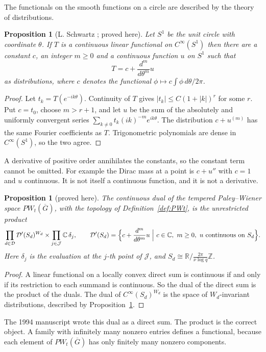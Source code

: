 \documentclass[12pt,letterpaper]{article}
\numberwithin{equation}{section}
\newtheorem{proposition}[theorem]{Proposition}
\theoremstyle{definition}
\newcommand{\proved}{proved here}
\newcommand{\C}{\mathbb C}
\newcommand{\R}{\mathbb R}
\newcommand{\Z}{\mathbb Z}
\newcommand{\bG}{\overline{G}}
\newcommand{\calD}{\mathcal D}
\begin{document}
The functionals on the smooth functions on a circle are described by the theory of
distributions.

\begin{proposition}[L. Schwartz {\cite[Ch.~III, Th\'eor\`eme~XXI]{Sc50}}; \proved]\label{prop:schwartz-circle}
Let $S^1$ be the unit circle with coordinate $\theta$.  If $T$ is a continuous linear
functional on $C^\infty(S^1)$ then there are a constant $c$, an integer $m\ge0$ and a
continuous function $u$ on $S^1$ such that
\[
T=c+\frac{d^m}{d\theta^m}u
\]
as distributions, where $c$ denotes the functional $\phi\mapsto c\int\phi\,d\theta/2\pi$.
\end{proposition}
\begin{proof}
Let $t_k=T(e^{-ik\theta})$.  Continuity of $T$ gives $|t_k|\le C(1+|k|)^r$ for some $r$.
Put $c=t_0$, choose $m>r+1$, and let $u$ be the sum of the absolutely and uniformly
convergent series $\sum_{k\ne0}t_k(ik)^{-m}e^{ik\theta}$.  The distribution $c+u^{(m)}$ has
the same Fourier coefficients as $T$.  Trigonometric polynomials are dense in
$C^\infty(S^1)$, so the two agree.
\end{proof}
A derivative of positive order annihilates the constants, so the constant term cannot be
omitted.  For example the Dirac mass at a point is $c+u''$ with $c=1$ and $u$ continuous.
It is not itself a continuous function, and it is not a derivative.

\begin{proposition}[\proved]\label{prop:dual}
The continuous dual of the tempered Paley--Wiener space $PW_t(\bG)$, with the topology of
Definition~\ref{def:PWt}, is the unrestricted product
\[
\prod_{d\in\mathcal D}\calD'(S_d)^{W_d}\times\prod_{j\in\mathcal J}\C\,\delta_j ,\qquad
\calD'(S_d)=\Bigl\{c+\frac{d^m}{d\theta^m}u\ \Big|\ c\in\C,\ m\ge0,\ u\ \text{continuous on}\ S_d\Bigr\}.
\]
Here $\delta_j$ is the evaluation at the $j$-th point of $\mathcal J$, and
$S_d\cong\R/\tfrac{2\pi}{\nu\log q}\Z$.
\end{proposition}
\begin{proof}
A linear functional on a locally convex direct sum is continuous if and only if its
restriction to each summand is continuous.  So the dual of the direct sum is the product
of the duals.  The dual of $C^\infty(S_d)^{W_d}$ is the space of $W_d$-invariant
distributions, described by Proposition~\ref{prop:schwartz-circle}.
\end{proof}
The 1994 manuscript wrote this dual as a direct sum.  The product is the correct object.
A family with infinitely many nonzero entries defines a functional, because each element
of $PW_t(\bG)$ has only finitely many nonzero components.
\end{document}
